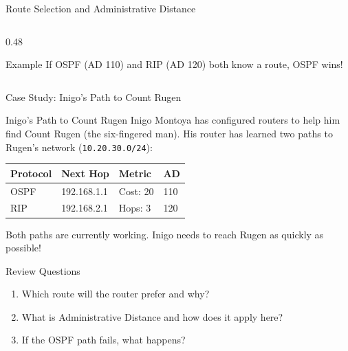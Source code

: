 \documentclass[aspectratio=169]{beamer}  %
\begin{document}
\begin{frame}{Route Selection and Administrative Distance}
\begin{columns}[T]
\begin{column}{0.48\textwidth}
            \vspace{0.2em}
            \begin{exampleblock}{Example}
                \small
                If OSPF (AD 110) and RIP (AD 120) both know a route, OSPF wins!
            \end{exampleblock}
        \end{column}
    \end{columns}
\end{frame}

\begin{frame}{Case Study: Inigo's Path to Count Rugen}
    \begin{casestudy}{Inigo's Path to Count Rugen}
        \small
        Inigo Montoya has configured routers to help him find Count Rugen (the six-fingered man). His router has learned two paths to Rugen's network (\texttt{10.20.30.0/24}):
        
        \vspace{0.3em}
        \footnotesize
        \begin{center}
            \begin{tabular}{l l l l}
                \toprule
                \textbf{Protocol} & \textbf{Next Hop} & \textbf{Metric} & \textbf{AD} \\
                \midrule
                OSPF & 192.168.1.1 & Cost: 20 & 110 \\
                RIP & 192.168.2.1 & Hops: 3 & 120 \\
                \bottomrule
            \end{tabular}
        \end{center}
        
        \vspace{0.2em}
        \small
        Both paths are currently working. Inigo needs to reach Rugen as quickly as possible!
    \end{casestudy}
    
    \begin{block}{Review Questions}
        \small
        \begin{enumerate}\setlength{\itemsep}{1pt}
            \item Which route will the router prefer and why?
            \item What is Administrative Distance and how does it apply here?
            \item If the OSPF path fails, what happens?
        \end{enumerate}
    \end{block}
\end{frame}
\end{document}
